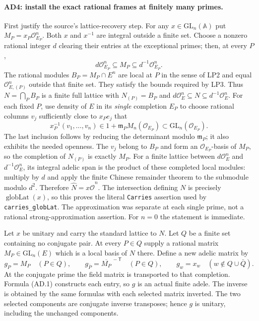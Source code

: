 \documentclass[11pt,a4paper]{article}
\numberwithin{equation}{section}
\theoremstyle{remark}\newtheorem{remark}[theorem]{Remark}
\begin{document}
\paragraph{AD4: install the exact rational frames at finitely many primes.}
First justify the source's lattice-recovery step. For any
$x\in\mathrm{GL}_n(\mathbb A)$ put
$M_P=x_P\mathcal O_{E_P}^n$. Both $x$ and $x^{-1}$ are integral
outside a finite set. Choose a nonzero rational integer $d$ clearing
their entries at the exceptional primes; then, at every $P$,
\[
 d\mathcal O_{E_P}^n\subseteq M_P\subseteq d^{-1}\mathcal O_{E_P}^n.
                                                               \tag{AD.13}
\]
The rational modules $B_P=M_P\cap E^n$ are local at $P$ in the
sense of LP2 and equal $\mathcal O_{E,(P)}^n$ outside that finite
set. They satisfy the bounds required by LP3. Thus
$N=\bigcap_P B_P$ is a finite full lattice with
$N_{(P)}=B_P$ and $d\mathcal O_E^n\subseteq N\subseteq
d^{-1}\mathcal O_E^n$.
For each fixed $P$, use density of $E$ in its \emph{single}
completion $E_P$ to choose rational columns $v_j$ sufficiently
close to $x_Pe_j$ that
\[
             x_P^{-1}(v_1,\ldots,v_n)
                    \in 1+\mathfrak m_P M_n(\mathcal O_{E_P})
                    \subset\mathrm{GL}_n(\mathcal O_{E_P}).
                                                               \tag{AD.14}
\]
The last inclusion follows by reducing the determinant modulo
$\mathfrak m_P$; it also exhibits the needed openness.
The $v_j$ belong to $B_P$ and form an $\mathcal O_{E_P}$-basis
of $M_P$, so the completion of $N_{(P)}$ is exactly $M_P$.
For a finite lattice between $d\mathcal O_E^n$ and
$d^{-1}\mathcal O_E^n$, its integral adelic span is the product
of these completed local modules: multiply by $d$ and apply the
finite Chinese remainder theorem to the submodule modulo $d^2$.
Therefore $\widehat N=x\widehat{\mathcal O}^n$.
The intersection defining $N$ is precisely
$\operatorname{globLat}(x)$, so this proves the literal
\texttt{Carries} assertion used by \texttt{carries\_\allowbreak globLat}.
The approximation was separate at each single prime, not a
rational strong-approximation assertion. For $n=0$ the statement
is immediate.

Let $x$ be unitary and carry the standard lattice to $N$.
Let $Q$ be a finite set containing no conjugate pair.
At every $P\in Q$ supply a rational matrix $M_P\in
\mathrm{GL}_n(E)$ which is a local basis of $N$ there.
Define a new adelic matrix by
\[
 g_P=M_P\quad(P\in Q),\qquad
 g_{\bar P}=\overline{M_P}^{\,-\mathsf T}\quad(P\in Q),
 \qquad g_w=x_w\quad(w\notin Q\cup\bar Q).           \tag{AD.11}
\]
At the conjugate prime the field matrix is transported to that
completion. Formula (AD.1) constructs each entry, so $g$ is
an actual finite adele. The inverse is obtained by the same
formulas with each selected matrix inverted. The two selected
components are conjugate inverse transposes; hence $g$ is
unitary, including the unchanged components.
\end{document}
